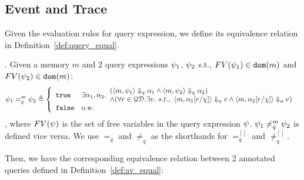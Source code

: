 {\subsection{Event and Trace}
%
%
%
%
%
Given the evaluation rules for query expression, we define its equivalence relation in Definition~\ref{def:query_equal}.
%
\begin{defn}.
%
\label{def:query_equal}
 Given a memory $m$ and 2 query expressions $\psi_1$, $\psi_2$ s.t., $FV(\psi_1) \in \mathtt{dom}(m)$ and $FV(\psi_2) \in \mathtt{dom}(m)$:
$$
\qexpr_1 =_{q}^{m} \qexpr_2 \triangleq
\left\{
    \begin{array}{ll} 
      \etrue      
      & 
    \exists \qval_1, \qval_2.
    \begin{array}{l} 
      (\config{m,  \qexpr_1} \qarrow \qval_1 \land \config{m,  \qexpr_2 } \qarrow \qval_2) 
      \\
      \land (\forall r \in \qdom. \exists v. ~ s.t., ~ 
            \config{m, \qval_1[r/\chi]} \aarrow v \land \config{m,  \qval_2[r/\chi] } \aarrow v)  
    \end{array}\\
      \efalse         
      & \text{o.w.} 
    \end{array}
    \right.
$$
%
, where $FV(\psi)$ is the set of free variables in the query expression $\psi$.
$\psi_1 \neq_{q}^{m} \psi_2$  is defined vice versa.
%
We use $=_{q}$  and $\neq_{q}$ as the shorthands for $=_{q}^{[]}$ and $\neq^{[]}_{q}$.
\end{defn}
%
Then, we have the corresponding equivalence relation between 2 annotated queries defined in Definition~\ref{def:av_equal}:
%
}
